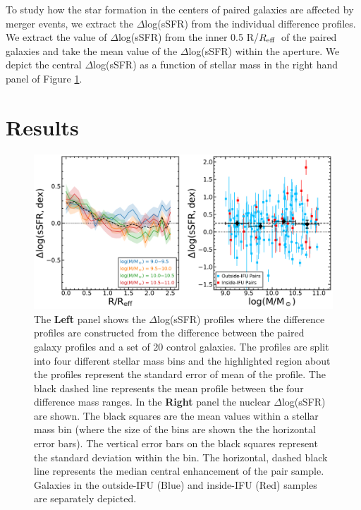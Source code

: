 \documentclass[iop,revtex4,twocolumn,apj,numberedappendix,appendixfloats]{emulateapj}
\newcommand{\reff}{$R_{\rm eff}$}
\begin{document}
To study how the star formation in the centers of paired galaxies are affected by merger events, we extract the $\Delta$log(sSFR) from the individual difference profiles. We extract the value of $\Delta$log(sSFR) from the inner 0.5 R/\reff\ of the paired galaxies and take the mean value of the $\Delta$log(sSFR) within the aperture. We depict the central $\Delta$log(sSFR) as a function of stellar mass in the right hand panel of Figure \ref{fig:ssfr_mass}.


\section{Results}\label{sec:results}

\begin{figure}
\centering
\includegraphics[width=\linewidth]{fig/ssfr_all_mass.pdf}
\caption[]{The \textbf{Left} panel shows the $\Delta$log(sSFR) profiles where the difference profiles are constructed from the difference between the paired galaxy profiles and a set of 20 control galaxies. The profiles are split into four different stellar mass bins and the highlighted region about the profiles represent the standard error of mean of the profile. The black dashed line represents the mean profile between the four difference mass ranges. In the \textbf{Right} panel the nuclear $\Delta$log(sSFR) are shown. The black squares are the mean values within a stellar mass bin (where the size of the bins are shown the the horizontal error bars). The vertical error bars on the black squares represent the standard deviation within the bin. The horizontal, dashed black line represents the median central enhancement of the pair sample. Galaxies in the outside-IFU (Blue) and inside-IFU (Red) samples are separately depicted.}
\label{fig:ssfr_mass}
\end{figure}
\end{document}
